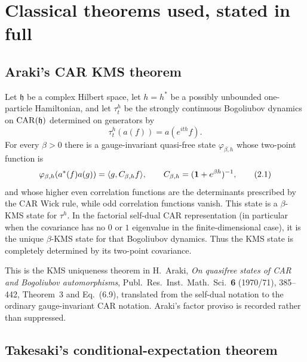 \section{Classical theorems used, stated in full}

\subsection{Araki's CAR KMS theorem}

\begin{theorem}
\label{thm:araki}
Let $\mathfrak h$ be a complex Hilbert space, let $h=h^*$ be a
possibly unbounded one-particle Hamiltonian, and let
$\tau_t^h$ be the strongly continuous Bogoliubov dynamics on
$\operatorname{CAR}(\mathfrak h)$ determined on generators by
\[
 \tau_t^h(a(f))=a(e^{ith}f).
\]
For every $\beta>0$ there is a gauge-invariant quasi-free state
$\varphi_{\beta,h}$ whose two-point function is
\[
 \varphi_{\beta,h}(a^*(f)a(g))
 =\langle g,C_{\beta,h}f\rangle,\qquad
 C_{\beta,h}=(\mathbf 1+e^{\beta h})^{-1},
\tag{2.1}\label{eq:araki-cov}
\]
and whose higher even correlation functions are the determinants
prescribed by the CAR Wick rule, while odd correlation functions
vanish.  This state is a $\beta$-KMS state for $\tau^h$.  In the
factorial self-dual CAR representation (in particular when the
covariance has no $0$ or $1$ eigenvalue in the finite-dimensional
case), it is the unique $\beta$-KMS state for that Bogoliubov
dynamics.  Thus the KMS state is completely determined by its
two-point covariance.
\end{theorem}

This is the KMS uniqueness theorem in
H.~Araki, \emph{On quasifree states of CAR and Bogoliubov
automorphisms}, Publ.\ Res.\ Inst.\ Math.\ Sci.\ \textbf{6}
(1970/71), 385--442, Theorem~3 and Eq.~(6.9), translated from the
self-dual notation to the ordinary gauge-invariant CAR notation.
Araki's factor proviso is recorded rather than suppressed.

\subsection{Takesaki's conditional-expectation theorem}

